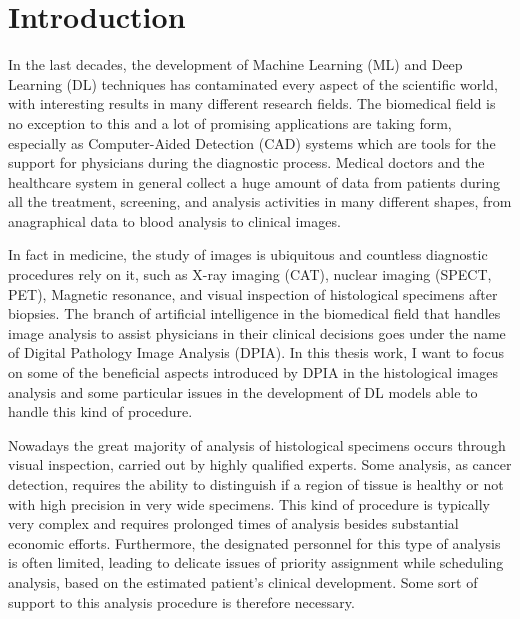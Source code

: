\chapter*{Introduction}
\label{chap:intro}
In the last decades, the development of Machine Learning (ML) and Deep Learning (DL) techniques has contaminated every aspect of the scientific world, with interesting results in many different research fields. The biomedical field is no exception to this and a lot of promising applications are taking form, especially as Computer-Aided Detection (CAD) systems which are tools for the support for physicians during the diagnostic process. Medical doctors and the healthcare system in general collect a huge amount of data from patients during all the treatment, screening, and analysis activities in many different shapes, from anagraphical data to blood analysis to clinical images.

In fact in medicine, the study of images is ubiquitous and countless diagnostic procedures rely on it, such as X-ray imaging (CAT), nuclear imaging (SPECT, PET), Magnetic resonance, and visual inspection of histological specimens after biopsies. The branch of artificial intelligence in the biomedical field that handles image analysis to assist physicians in their clinical decisions goes under the name of Digital Pathology Image Analysis (DPIA).
In this thesis work, I want to focus on some of the beneficial aspects introduced by DPIA in the histological images analysis and some particular issues in the development of DL models able to handle this kind of procedure.

Nowadays the great majority of analysis of histological specimens occurs through visual inspection, carried out by highly qualified experts. Some analysis, as cancer detection, requires the ability to distinguish if a region of tissue is healthy or not with high precision in very wide specimens. This kind of procedure is typically very complex and requires prolonged times of analysis besides substantial economic efforts. Furthermore, the designated personnel for this type of analysis is often limited, leading to delicate issues of priority assignment while scheduling analysis, based on the estimated patient's clinical development. Some sort of support to this analysis procedure is therefore necessary.

